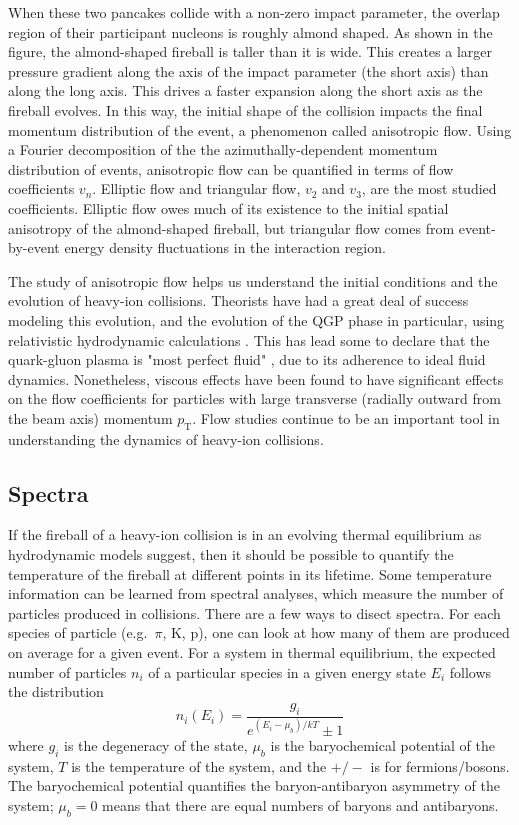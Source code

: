 When these two pancakes collide with a non-zero impact parameter, the overlap region of their participant nucleons is roughly almond shaped.
As shown in the figure, the almond-shaped fireball is taller than it is wide.
This creates a larger pressure gradient along the axis of the impact parameter (the short axis) than along the long axis.
This drives a faster expansion along the short axis as the fireball evolves.
In this way, the initial shape of the collision impacts the final momentum distribution of the event, a phenomenon called anisotropic flow.
Using a Fourier decomposition of the the azimuthally-dependent momentum distribution of events, anisotropic flow can be quantified in terms of flow coefficients $v_n$.
Elliptic flow and triangular flow, $v_2$ and $v_3$,  are the most studied coefficients.
Elliptic flow owes much of its existence to the initial spatial anisotropy of the almond-shaped fireball, but triangular flow comes from event-by-event energy density fluctuations in the interaction region.

The study of anisotropic flow helps us understand the initial conditions and the evolution of heavy-ion collisions.
Theorists have had a great deal of success modeling  this evolution, and the evolution of the QGP phase in particular, using relativistic hydrodynamic calculations \cite{Heinz:2013th}.
This has lead some to declare that the quark-gluon plasma is "most perfect fluid" \cite{Heinz:2005zg}, due to its adherence to ideal fluid dynamics.
Nonetheless, viscous effects have been found to have significant effects on the flow coefficients for particles with large transverse (radially outward from the beam axis) momentum $p_\mathrm{T}$.
Flow studies continue to be an important tool in understanding the dynamics of heavy-ion collisions.

\subsection{Spectra}

If the fireball of a heavy-ion collision is in an evolving thermal equilibrium as hydrodynamic models suggest, then it should be possible to quantify the temperature of the fireball at different points in its lifetime.
Some temperature information can be learned from spectral analyses, which measure the number of particles produced in collisions.
There are a few ways to disect spectra.
For each species of particle (e.g.\ $\pi$, K, p), one can look at how many of them are produced on average for a given event.
For a system in thermal equilibrium, the expected number of particles $n_i$ of a particular species in a given energy state $E_i$ follows the distribution
\begin{equation}
\label{eq:ThermalDistribution}
n_i(E_i) = \frac{g_i}{e^{(E_i - \mu_b)/kT} \pm 1}
\end{equation}
where $g_i$ is the degeneracy of the state, $\mu_b$ is the baryochemical potential of the system,  $T$ is the temperature of the system, and the  $+/-$ is for fermions/bosons. 
The baryochemical potential quantifies the baryon-antibaryon asymmetry of the system; $\mu_b = 0$ means that there are equal numbers of baryons and antibaryons.

